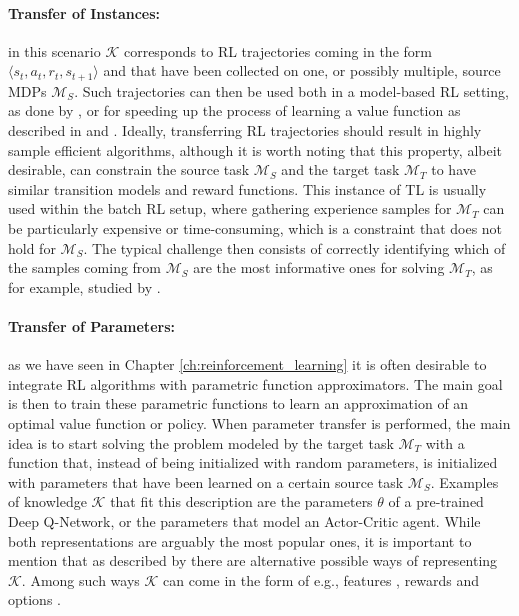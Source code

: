 \paragraph{Transfer of Instances:} in this scenario $\mathcal{K}$ corresponds to RL trajectories coming in the form $\langle s_t, a_t, r_t, s_{t+1}\rangle$ and that have been collected on one, or possibly multiple, source MDPs $\mathcal{M}_S$. Such trajectories can then be used both in a model-based RL setting, as done by \citet{taylor2008transferring}, or for speeding up the process of learning a value function as described in \cite{lazaric2008transfer} and \cite{laroche2017transfer}. Ideally, transferring RL trajectories should result in highly sample efficient algorithms, although it is worth noting that this property, albeit desirable, can constrain the source task $\mathcal{M}_S$ and the target task $\mathcal{M}_T$ to have similar transition models and reward functions. This instance of TL is usually used within the batch RL setup, where gathering experience samples for $\mathcal{M}_T$ can be particularly expensive or time-consuming, which is a constraint that does not hold for $\mathcal{M}_S$. The typical challenge then consists of correctly identifying which of the samples coming from $\mathcal{M}_S$ are the most informative ones for solving $\mathcal{M}_T$, as for example, studied by \citet{tirinzoni2018importance}.

\paragraph{Transfer of Parameters:} as we have seen in Chapter \ref{ch:reinforcement_learning} it is often desirable to integrate RL algorithms with parametric function approximators. The main goal is then to train these parametric functions to learn an approximation of an optimal value function or policy. When parameter transfer is performed, the main idea is to start solving the problem modeled by the target task $\mathcal{M}_T$ with a function that, instead of being initialized with random parameters, is initialized with parameters that have been learned on a certain source task $\mathcal{M}_S$. Examples of knowledge $\mathcal{K}$ that fit this description are the parameters $\theta$ of a pre-trained Deep Q-Network, or the parameters that model an Actor-Critic agent.  
\bigbreak
While both representations are arguably the most popular ones, it is important to mention that as described by \citet{tirinzoni2018transfer} there are alternative possible ways of representing $\mathcal{K}$. Among such ways $\mathcal{K}$ can come in the form of e.g., features \cite{mehta2008transfer,barreto2017successor}, rewards \cite{konidaris2006autonomous,schaal2004estimating} and options \cite{singh2005intrinsically}.

